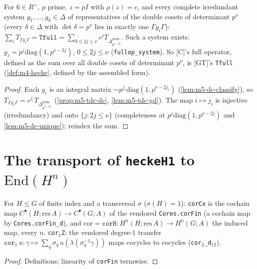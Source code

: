 \begin{theorem}\label{thm:m5-fullop}
  \leanok
  For $6\in R^\times$, $p$ prime, $z=pI$ with $\rho(z)=c$, and every complete irredundant system $g_1,\dots,g_k\in\Delta$ of
  representatives of the double cosets of determinant $p^\nu$ (every $\delta\in\Delta$ with $\det\delta=p^\nu$ lies in exactly one
  $\Gamma g_i\Gamma$): $\sum_iT_{\Gamma g_i\Gamma}=\texttt{Tfull}=\sum_{0\le2j\le\nu}c^jT_{\Delta^{\mathrm{prim}}_{p^{\nu-2j}}}$.
  Such a system exists: $g_j=p^j\mathrm{diag}(1,p^{\nu-2j})$, $0\le2j\le\nu$ (\texttt{fullop\_system}). So [C]'s full operator,
  defined as the sum over all double cosets of determinant $p^\nu$, is [GT]'s \texttt{Tfull} (\ref{def:m4-hecke}, defined by the
  assembled form).
\end{theorem}
\begin{proof}
  \leanok
  Each $g_i$ is an integral matrix $\sim p^{j_i}\mathrm{diag}(1,p^{\nu-2j_i})$ (\ref{lem:m5-dc-classify}), so
  $T_{\Gamma g_i\Gamma}=c^{j_i}T_{\Delta^{\mathrm{prim}}_{p^{\nu-2j_i}}}$ (\ref{prop:m5-tdc-dc}, \ref{lem:m5-tdc-gd}). The map
  $i\mapsto j_i$ is injective (irredundancy) and onto $\{j:2j\le\nu\}$ (completeness at $p^j\mathrm{diag}(1,p^{\nu-2j})$ and
  \ref{lem:m5-dc-unique}); reindex the sum.
\end{proof}

\section{The transport of \texttt{heckeH1} to \texorpdfstring{$\mathrm{End}(H^n)$}{End(H\textasciicircum n)}}

\begin{definition}\label{def:m5-corH}
  \leanok
  For $H\le G$ of finite index and a transversal $\sigma$ ($\sigma(H)=1$): \texttt{corCx} is the cochain map
  $C^\bullet(H;\mathrm{res}\,A)\to C^\bullet(G;A)$ of the vendored \texttt{Cores.corFin} (a cochain map by
  \texttt{Cores.corFin\_d}), and $\mathrm{cor}=\texttt{corH}\colon H^n(H;\mathrm{res}\,A)\to H^n(G;A)$ the induced map, every $n$.
  \texttt{cor}$_1$\texttt{Z}: the vendored degree-$1$ transfer $\texttt{cor}_1\,u\colon\gamma\mapsto\sum_q\sigma_q\,u(\lambda(\sigma_q^{-1}\gamma))$
  maps cocycles to cocycles (\texttt{cor}$_2$\texttt{\_d}$_{12}$).
\end{definition}
\begin{proof}
  \leanok
  Definitions; linearity of \texttt{corFin} termwise.
\end{proof}

